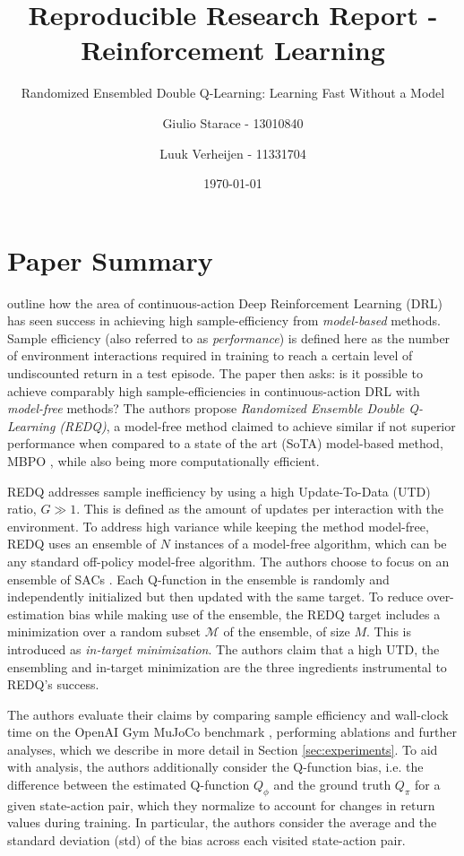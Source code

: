 \documentclass{article}
\title{\vspace{-3em}Reproducible Research Report - Reinforcement Learning}
\subtitle{Randomized Ensembled Double Q-Learning: Learning Fast Without a Model}
\author{
Giulio Starace - 13010840 \and
Luuk Verheijen - 11331704
}
\date{\today}
\begin{document}
\maketitle
\section{Paper Summary}
\citet{chen_randomized_2022} outline how the area of continuous-action Deep Reinforcement Learning (DRL) has seen success in achieving high sample-efficiency from \textit{model-based} methods. Sample efficiency (also referred to as \textit{performance}) is defined here as the number of environment interactions required in training to reach a certain level of undiscounted return in a test episode. The paper then asks: is it possible to achieve comparably high sample-efficiencies in continuous-action DRL with \textit{model-free} methods? The authors propose \textit{Randomized Ensemble Double Q-Learning (REDQ)}, a model-free method claimed to achieve similar if not superior performance when compared to a state of the art (SoTA) model-based method, MBPO \citep{janner_when_2019}, while also being more computationally efficient. 

REDQ addresses sample inefficiency by using a high Update-To-Data (UTD) ratio, $G \gg 1$. This is defined as the amount of updates per interaction with the environment. To address high variance while keeping the method model-free, REDQ uses an ensemble of $N$ instances of a model-free algorithm, which can be any standard off-policy model-free algorithm. The authors choose to focus on an ensemble of SACs \citep{haarnoja_soft_2018}. Each Q-function in the ensemble is randomly and independently initialized but then updated with the same target. To reduce over-estimation bias while making use of the ensemble, the REDQ target includes a minimization over a random subset $\mathcal{M}$ of the ensemble, of size $M$. This is introduced as \textit{in-target minimization}. The authors claim that a high UTD, the ensembling and in-target minimization are the three ingredients instrumental to REDQ's success.

The authors evaluate their claims by comparing sample efficiency and wall-clock time on the OpenAI Gym MuJoCo benchmark \citep{todorov_mujoco_2012, brockman_openai_2016}, performing ablations and further analyses, which we describe in more detail in Section \ref{sec:experiments}. To aid with analysis, the authors additionally consider the Q-function bias, i.e. the difference between the estimated Q-function $Q_\phi$ and the ground truth $Q_\pi$ for a given state-action pair, which they normalize to account for changes in return values during training. In particular, the authors consider the average and the standard deviation (std) of the bias across each visited state-action pair. 
\end{document}
